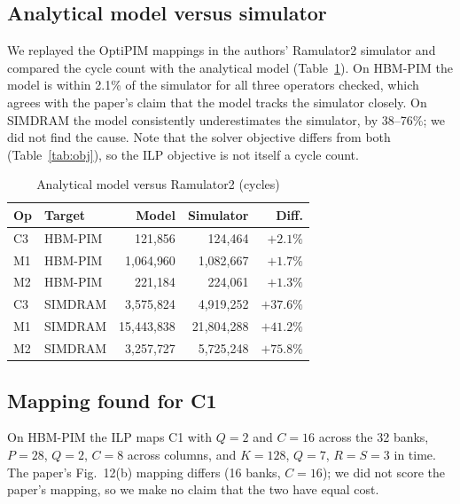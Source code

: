\subsection{Analytical model versus simulator}
\label{sec:simcheck}
We replayed the OptiPIM mappings in the authors' Ramulator2 simulator and
compared the cycle count with the analytical model (Table~\ref{tab:sim}).
On HBM-PIM the model is within 2.1\% of the simulator for all three
operators checked, which agrees with the paper's claim that the model tracks
the simulator closely. On SIMDRAM the model consistently underestimates the
simulator, by 38--76\%; we did not find the cause. Note
that the solver objective differs from both (Table~\ref{tab:obj}), so the ILP
objective is not itself a cycle count.

\begin{table}[t]
\centering
\footnotesize
\caption{Analytical model versus Ramulator2 (cycles)}
\label{tab:sim}
\begin{tabular}{llrrr}
\hline
Op & Target & Model & Simulator & Diff. \\
\hline
C3 & HBM-PIM & 121{,}856 & 124{,}464 & $+2.1\%$ \\
M1 & HBM-PIM & 1{,}064{,}960 & 1{,}082{,}667 & $+1.7\%$ \\
M2 & HBM-PIM & 221{,}184 & 224{,}061 & $+1.3\%$ \\
C3 & SIMDRAM & 3{,}575{,}824 & 4{,}919{,}252 & $+37.6\%$ \\
M1 & SIMDRAM & 15{,}443{,}838 & 21{,}804{,}288 & $+41.2\%$ \\
M2 & SIMDRAM & 3{,}257{,}727 & 5{,}725{,}248 & $+75.8\%$ \\
\hline
\end{tabular}
\end{table}

\subsection{Mapping found for C1}
On HBM-PIM the ILP maps C1 with $Q{=}2$ and $C{=}16$ across the 32 banks, $P{=}28$,
$Q{=}2$, $C{=}8$ across columns, and $K{=}128$, $Q{=}7$, $R{=}S{=}3$ in time. The paper's
Fig.~12(b) mapping differs (16 banks, $C{=}16$); we did not score the paper's
mapping, so we make no claim that the two have equal cost.

